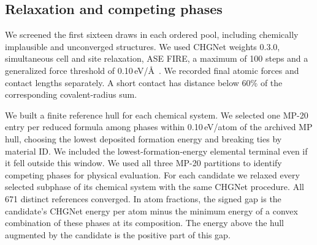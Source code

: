 \subsection{Relaxation and competing phases}
We screened the first sixteen draws in each ordered pool, including chemically implausible and unconverged structures. We used CHGNet weights 0.3.0, simultaneous cell and site relaxation, ASE FIRE, a maximum of 100 steps and a generalized force threshold of 0.10\,eV/\AA\ \cite{chgnet}. We recorded final atomic forces and contact lengths separately. A short contact has distance below 60\% of the corresponding covalent-radius sum.

We built a finite reference hull for each chemical system. We selected one MP-20 entry per reduced formula among phases within 0.10\,eV/atom of the archived MP hull, choosing the lowest deposited formation energy and breaking ties by material ID. We included the lowest-formation-energy elemental terminal even if it fell outside this window. We used all three MP-20 partitions to identify competing phases for physical evaluation. For each candidate we relaxed every selected subphase of its chemical system with the same CHGNet procedure. All 671 distinct references converged. In atom fractions, the signed gap is the candidate's CHGNet energy per atom minus the minimum energy of a convex combination of these phases at its composition. The energy above the hull augmented by the candidate is the positive part of this gap.

